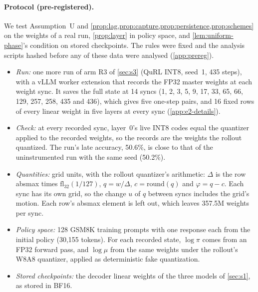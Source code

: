 \paragraph{Protocol (pre-registered).} We test Assumption~U and \cref{prop:lag,prop:capture,prop:persistence,prop:schemes} on the weights of a real run, \cref{prop:layer} in policy space, and \cref{lem:uniform-phase}'s condition on stored checkpoints. The rules were fixed and the analysis scripts hashed before any of these data were analysed (\cref{app:prereg}).
\begin{itemize}[leftmargin=*,itemsep=1pt]
\item \emph{Run:} one more run of arm R3 of \cref{sec:s3} (QuRL INT8, seed~1, 435 steps), with a vLLM worker extension that records the FP32 master weights at each weight sync. It saves the full state at 14 syncs (1, 2, 3, 5, 9, 17, 33, 65, 66, 129, 257, 258, 435 and 436), which gives five one-step pairs, and 16 fixed rows of every linear weight in five layers at every sync (\cref{app:e2-details}).
\item \emph{Check:} at every recorded sync, layer~0's live INT8 codes equal the quantizer applied to the recorded weights, so the records are the weights the rollout quantized. The run's late accuracy, 50.6\%, is close to that of the uninstrumented run with the same seed (50.2\%).
\item \emph{Quantities:} grid units, with the rollout quantizer's arithmetic: $\Delta$ is the row absmax times $\mathrm{fl}_{32}(1/127)$, $q=w/\Delta$, $c=\mathrm{round}(q)$ and $\varphi=q-c$. Each sync has its own grid, so the change $u$ of $q$ between syncs includes the grid's motion. Each row's absmax element is left out, which leaves 357.5M weights per sync.
\item \emph{Policy space:} 128 GSM8K training prompts with one response each from the initial policy (30{,}155 tokens). For each recorded state, $\log\pi$ comes from an FP32 forward pass, and $\log\mu$ from the same weights under the rollout's W8A8 quantizer, applied as deterministic fake quantization.
\item \emph{Stored checkpoints:} the decoder linear weights of the three models of \cref{sec:s1}, as stored in BF16.
\end{itemize}

